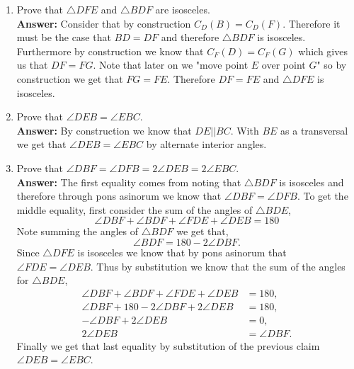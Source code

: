 \documentclass[12pt]{article}
\theoremstyle{homework}
\begin{document}
\begin{enumerate}
   

  \item Prove that $\triangle DFE$ and $\triangle BDF$ are isosceles.\\
  \textbf{Answer:} Consider that by construction $C_D(B) = C_D(F)$. Therefore it must be the case that $BD = DF$ and therefore $\triangle BDF$
  is isosceles. Furthermore by construction we know that $C_F(D) = C_F(G)$ which gives us that $DF = FG$. Note that later on we "move point $E$ over point $G$"
  so by construction we get that $FG = FE$. Therefore $DF = FE$ and $\triangle DFE$ is isosceles. 
  \vspace{.5in}
  \item Prove that $\angle DEB = \angle EBC$.\\
  \textbf{Answer:} By construction we know that $DE || BC$. With $BE$ as a transversal we get that  $\angle DEB = \angle EBC$ by alternate interior angles.
  \vspace{.5in}



  \item Prove that $\angle DBF = \angle DFB = 2\angle DEB = 2\angle EBC$. \\
  \textbf{Answer:} The first equality comes from noting that $\triangle BDF$ is isosceles and therefore through pons asinorum we know that $\angle DBF = \angle DFB$.
  To get the middle equality, first consider the sum of the angles of $\triangle BDE$,
  \begin{equation*}
    \angle DBF + \angle BDF + \angle FDE + \angle DEB = 180
  \end{equation*}
  Note summing the angles of $\triangle BDF$ we get that, 
  \begin{equation*}
    \angle BDF  = 180 - 2\angle DBF.
  \end{equation*} 
  Since $\triangle DFE$ is isosceles we know that by pons asinorum that $\angle FDE  = \angle DEB$. Thus by substitution we know that the sum of the angles 
  for $\triangle BDE$,
  \begin{align*}
    \angle DBF + \angle BDF + \angle FDE + \angle DEB &= 180,\\
    \angle DBF + 180 - 2\angle DBF + 2\angle DEB &= 180,\\
    -\angle DBF + 2\angle DEB &= 0,\\
    2\angle DEB &= \angle DBF.
  \end{align*}
  Finally we get that last equality by substitution of the previous claim $\angle DEB = \angle EBC$.
  \vspace{.5in}
  

\end{enumerate}
\end{document}
